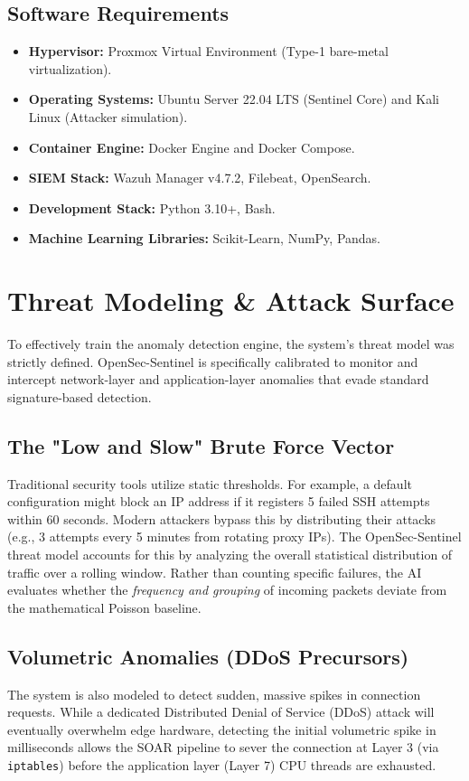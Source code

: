 \documentclass[12pt, a4paper]{report}
\begin{document}
	\subsection{Software Requirements}
	\begin{itemize}
		\item \textbf{Hypervisor:} Proxmox Virtual Environment (Type-1 bare-metal virtualization).
		\item \textbf{Operating Systems:} Ubuntu Server 22.04 LTS (Sentinel Core) and Kali Linux (Attacker simulation).
		\item \textbf{Container Engine:} Docker Engine and Docker Compose.
		\item \textbf{SIEM Stack:} Wazuh Manager v4.7.2, Filebeat, OpenSearch.
		\item \textbf{Development Stack:} Python 3.10+, Bash.
		\item \textbf{Machine Learning Libraries:} Scikit-Learn, NumPy, Pandas.
	\end{itemize}
	
	\section{Threat Modeling \& Attack Surface}
	To effectively train the anomaly detection engine, the system's threat model was strictly defined. OpenSec-Sentinel is specifically calibrated to monitor and intercept network-layer and application-layer anomalies that evade standard signature-based detection.
	
	\subsection{The "Low and Slow" Brute Force Vector}
	Traditional security tools utilize static thresholds. For example, a default configuration might block an IP address if it registers 5 failed SSH attempts within 60 seconds. Modern attackers bypass this by distributing their attacks (e.g., 3 attempts every 5 minutes from rotating proxy IPs). The OpenSec-Sentinel threat model accounts for this by analyzing the overall statistical distribution of traffic over a rolling window. Rather than counting specific failures, the AI evaluates whether the \textit{frequency and grouping} of incoming packets deviate from the mathematical Poisson baseline.
	
	\subsection{Volumetric Anomalies (DDoS Precursors)}
	The system is also modeled to detect sudden, massive spikes in connection requests. While a dedicated Distributed Denial of Service (DDoS) attack will eventually overwhelm edge hardware, detecting the initial volumetric spike in milliseconds allows the SOAR pipeline to sever the connection at Layer 3 (via \texttt{iptables}) before the application layer (Layer 7) CPU threads are exhausted.
	
\end{document}
